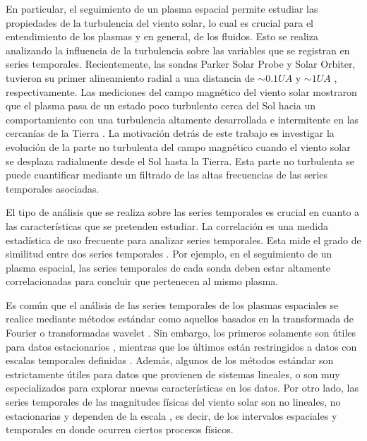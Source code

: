 En particular, el seguimiento de un plasma espacial permite estudiar las propiedades de la turbulencia del viento solar, lo cual es crucial para el entendimiento de los plasmas y en general, de los fluidos. Esto se realiza analizando la influencia de la turbulencia sobre las variables que se registran en series temporales. Recientemente, las sondas Parker Solar Probe y Solar Orbiter, tuvieron su primer alineamiento radial a una distancia de $ \sim 0.1 UA$ y $ \sim 1 UA$ \cite{telloni_evolution_2021}, respectivamente. Las mediciones del campo magnético del viento solar mostraron que el plasma pasa de un estado poco turbulento cerca del Sol hacia un comportamiento con una turbulencia altamente desarrollada e intermitente en las cercanías de la Tierra \cite{telloni_evolution_2021}. La motivación detrás de este trabajo es investigar la evolución de la parte no turbulenta del campo magnético cuando el viento solar se desplaza radialmente desde el Sol hasta la Tierra. Esta parte no turbulenta se puede cuantificar mediante un filtrado de las altas frecuencias de las series temporales asociadas.

El tipo de análisis que se realiza sobre las series temporales es crucial en cuanto a las características que se pretenden estudiar. La correlación es una medida estadística de uso frecuente para analizar series temporales. Esta mide el grado de similitud entre dos series temporales \cite{chatfield_analysis_2019}. Por ejemplo, en el seguimiento de un plasma espacial, las series temporales de cada sonda deben estar altamente correlacionadas para concluir que pertenecen al mismo plasma.

Es común que el análisis de las series temporales de los plasmas espaciales se realice mediante métodos estándar como aquellos basados en la transformada de Fourier o transformadas wavelet \cite{chatfield_analysis_2019}. Sin embargo, los primeros solamente son útiles para datos estacionarios \cite{chatfield_analysis_2019}, mientras que los últimos están restringidos a datos con escalas temporales definidas \cite{huang_empirical_1998, Percival}. Además, algunos de los métodos estándar son estrictamente útiles para datos que provienen de sistemas lineales, o son muy especializados para explorar nuevas características en los datos. Por otro lado, las series temporales de las magnitudes físicas del viento solar son no lineales, no estacionarias y dependen de la escala \cite{de_michelis_multi-scale_2012, carbone_arbitrary-order_2018, alberti_multifractal_2019, carbone_statistical_2020, carbone_statistical_2021}, es decir, de los intervalos espaciales y temporales en donde ocurren ciertos procesos físicos.   

